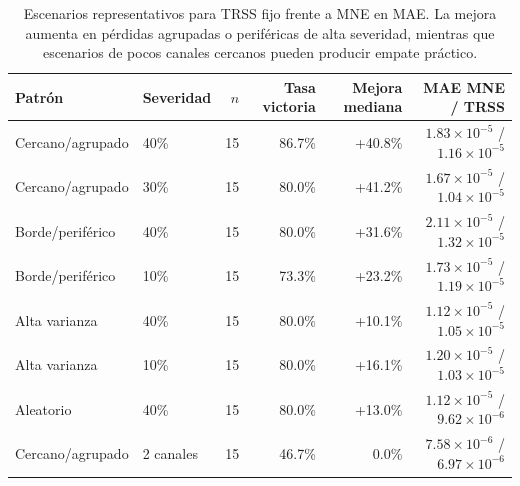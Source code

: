 \begin{table}[htbp]
\centering
\small
\caption{Escenarios representativos para TRSS fijo frente a MNE en MAE. La mejora aumenta en pérdidas agrupadas o periféricas de alta severidad, mientras que escenarios de pocos canales cercanos pueden producir empate práctico.}
\label{tab:ch6_selected_scenarios_mae}
\begin{tabular}{@{}llrrrr@{}}
\toprule
Patrón & Severidad & $n$ & Tasa victoria & Mejora mediana & MAE MNE / TRSS \\
\midrule
Cercano/agrupado & 40\% & 15 & 86.7\% & +40.8\% & $1.83\times 10^{-5}$ / $1.16\times 10^{-5}$ \\
Cercano/agrupado & 30\% & 15 & 80.0\% & +41.2\% & $1.67\times 10^{-5}$ / $1.04\times 10^{-5}$ \\
Borde/periférico & 40\% & 15 & 80.0\% & +31.6\% & $2.11\times 10^{-5}$ / $1.32\times 10^{-5}$ \\
Borde/periférico & 10\% & 15 & 73.3\% & +23.2\% & $1.73\times 10^{-5}$ / $1.19\times 10^{-5}$ \\
Alta varianza & 40\% & 15 & 80.0\% & +10.1\% & $1.12\times 10^{-5}$ / $1.05\times 10^{-5}$ \\
Alta varianza & 10\% & 15 & 80.0\% & +16.1\% & $1.20\times 10^{-5}$ / $1.03\times 10^{-5}$ \\
Aleatorio & 40\% & 15 & 80.0\% & +13.0\% & $1.12\times 10^{-5}$ / $9.62\times 10^{-6}$ \\
Cercano/agrupado & 2 canales & 15 & 46.7\% & 0.0\% & $7.58\times 10^{-6}$ / $6.97\times 10^{-6}$ \\
\bottomrule
\end{tabular}
\end{table}
